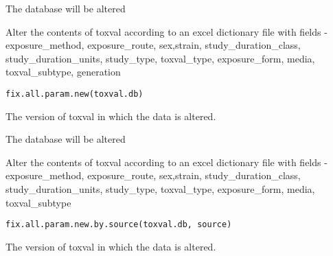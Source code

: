 \documentclass[letterpaper]{book}
\begin{document}
%
\begin{Value}
The database will be altered
\end{Value}
%
\begin{Description}\relax
Alter the contents of toxval according to an excel dictionary file with fields -
exposure\_method, exposure\_route, sex,strain, study\_duration\_class, study\_duration\_units, study\_type,
toxval\_type, exposure\_form, media, toxval\_subtype, generation
\end{Description}
%
\begin{Usage}
\begin{verbatim}
fix.all.param.new(toxval.db)
\end{verbatim}
\end{Usage}
%
\begin{Arguments}
\begin{ldescription}
\item[\code{toxval.db}] The version of toxval in which the data is altered.
\end{ldescription}
\end{Arguments}
%
\begin{Value}
The database will be altered
\end{Value}
%
\begin{Description}\relax
Alter the contents of toxval according to an excel dictionary file with fields -
exposure\_method, exposure\_route, sex,strain, study\_duration\_class, study\_duration\_units, study\_type,
toxval\_type, exposure\_form, media, toxval\_subtype
\end{Description}
%
\begin{Usage}
\begin{verbatim}
fix.all.param.new.by.source(toxval.db, source)
\end{verbatim}
\end{Usage}
%
\begin{Arguments}
\begin{ldescription}
\item[\code{toxval.db}] The version of toxval in which the data is altered.
\end{ldescription}
\end{Arguments}
\end{document}
